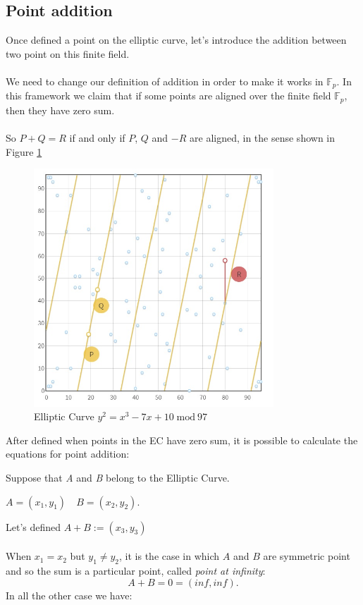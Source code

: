 \subsection{Point addition}
Once defined a point on the elliptic curve, let's introduce the addition between two point on this finite field.
\\ \\
We need to change our definition of addition in order to make it works in $\mathbb{F}_p$. In this framework we claim that if some points are aligned over the finite field $\mathbb{F}_p$, then they have zero sum.
\\ \\
So $P+Q=R$ if and only if $P$, $Q$ and $-R$ are aligned, in the sense shown in Figure \ref{fig:EC_aligned}
\begin{figure}[ht!]
	\centering
	\includegraphics[width=9cm]{Figures/EC_aligned.jpg}
	\caption{Elliptic Curve $y^2=x^3-7x+10 \; \textrm{mod} \ 97$}
	\label{fig:EC_aligned}
\end{figure}

\begin{flushleft}
	After defined when points in the EC have zero sum, it is possible to calculate the equations for point addition:
\end{flushleft}
Suppose that \textit{A} and \textit{B} belong to the Elliptic Curve.

\begin{center}
	$ A=(x_1,y_1) \quad B=(x_2,y_2)$.
\end{center}
Let's defined $ A+B :=(x_3,y_3) $ 
\\ \\
When $x_1=x_2$ but $y_1 \neq y_2$, it is the case in which $A$ and $B$ are symmetric point and so the sum is a particular point, called \textit{point at infinity}: 
\begin{equation*}
A+B=0=	(inf,inf) .
\end{equation*}
In all the other case we have:



